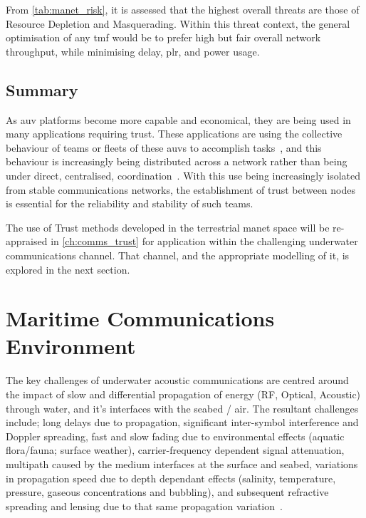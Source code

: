 From \autoref{tab:manet_risk}, it is assessed that the highest overall threats are those of Resource Depletion and Masquerading.
Within this threat context, the general optimisation of any \gls{tmf} would be to prefer high but fair overall network throughput, while minimising delay, \gls{plr}, and power usage.

\subsection{Summary}

As \acrfull{auv} platforms become more capable and economical, they are being used in many applications requiring trust.
These applications are using the collective behaviour of teams or fleets of these \glspl{auv} to accomplish tasks~\cite{Caiti2011}, and this behaviour is increasingly being distributed across a network rather than being under direct, centralised, coordination~\cite{Korzun2015}.
With this use being increasingly isolated from stable communications networks, the establishment of trust between nodes is essential for the reliability and stability of such teams.

The use of Trust methods developed in the terrestrial \gls{manet} space will be re-appraised in \autoref{ch:comms_trust} for application within the challenging underwater communications channel.
That channel, and the appropriate modelling of it, is explored in the next section.
\pagebreak

\section{Maritime Communications Environment}\label{sec:marine_comms}

The key challenges of underwater acoustic communications are centred around the impact of slow and differential propagation of energy (RF, Optical, Acoustic) through water, and it's interfaces with the seabed / air.
The resultant challenges include; long delays due to propagation, significant inter-symbol interference and Doppler spreading, fast and slow fading due to environmental effects (aquatic flora/fauna; surface weather), carrier-frequency dependent signal attenuation, multipath caused by the medium interfaces at the surface and seabed, variations in propagation speed due to depth dependant effects (salinity, temperature, pressure, gaseous concentrations and bubbling), and subsequent refractive spreading and lensing due to that same propagation variation~\cite{Partan2006}.

